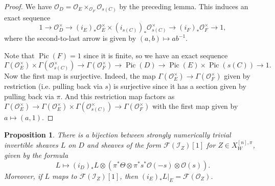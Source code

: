 \documentclass{amsart}
\theoremstyle{plain}
\newtheorem{proposition}[theorem]{Proposition}
\theoremstyle{definition}
\theoremstyle{remark}
\begin{document}
    \begin{proof}
        We have $\mathcal O_D=\mathcal O_E\times_{\mathcal O_F}\mathcal O_{s(C)}$ by the preceding lemma.
        This induces an exact sequence
        \[
            1\to \mathcal O_D^\times\to (i_E)_\ast\mathcal O_E^\times\times (i_{s(C)})_\ast\mathcal O_{s(C)}^\times\to(i_F)_\ast\mathcal O_F^\times\to 1,
        \]
        where the second-to-last arrow is given by $(a,b)\mapsto ab^{-1}$.

        Note that $\operatorname{Pic}(F)=1$ since it is finite, so we have an exact sequence
        \[
        \Gamma(\mathcal O_E^\times)\times \Gamma(\mathcal O_{s(C)}^\times)\to \Gamma(\mathcal O_F^\times)\to\operatorname{Pic}(D)\to\operatorname{Pic}(E)\times\operatorname{Pic}(s(C))\to 1.
        \]
        Now the first map is surjective.
        Indeed, the map $\Gamma(\mathcal O_E^\times)\to \Gamma(\mathcal O_F^\times)$ given by restriction (i.e. pulling back via $s$) is surjective since it has a section given by pulling back via $\pi$.
        And this restriction map factors as $\Gamma(\mathcal O_E^\times)\to\Gamma(\mathcal O_E^\times)\times \Gamma(\mathcal O_{s(C)}^\times)\to \Gamma(\mathcal O_F^\times)$ with the first map given by $a\mapsto (a,1)$.
    \end{proof}
    \begin{proposition}\label{tensor_adjust}
        There is a bijection between strongly numerically trivial invertible sheaves $L$ on $D$ and sheaves of the form $\mathcal F(\mathcal I_Z)[1]$ for $Z\in X^{[n],\pi}_W$, given by the formula
        \[L\mapsto (i_{D})_\ast L\otimes(\pi^\ast\Theta\otimes \pi^\ast s^{\ast}\mathcal O(-s)\otimes\mathcal O(s)).\]
        Moreover, if $L$ maps to $\mathcal F(\mathcal I_Z)[1]$, then $(i_E)_\ast L|_E=\mathcal F(\mathcal O_Z)$.
    \end{proposition}
\end{document}
